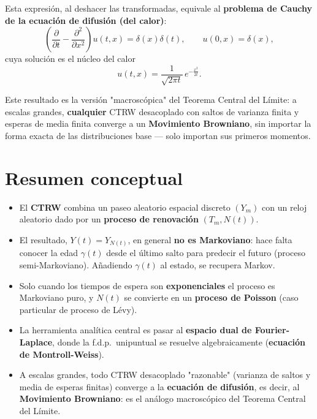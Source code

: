 \documentclass[10pt]{book}
\begin{document}
\begin{teo}
Esta expresión, al deshacer las transformadas, equivale al \textbf{problema de Cauchy de la ecuación de difusión (del calor)}:
\begin{equation*}
    \left(\frac{\partial}{\partial t}-\frac{\partial^2}{\partial x^2}\right)u(t,x) = \delta(x)\delta(t), \qquad u(0,x)=\delta(x),
\end{equation*}
cuya solución es el núcleo del calor
\begin{equation*}
    u(t,x) = \frac{1}{\sqrt{2\pi t}}\, e^{-\frac{x^2}{2t}}.
\end{equation*}
\end{teo}

\begin{observacion}
Este resultado es la versión "macroscópica" del Teorema Central del Límite: a escalas grandes, \textbf{cualquier} CTRW desacoplado con saltos de varianza finita y esperas de media finita converge a un \textbf{Movimiento Browniano}, sin importar la forma exacta de las distribuciones base — solo importan sus primeros momentos.
\end{observacion}

\section{Resumen conceptual}

\begin{itemize}
    \item El \textbf{CTRW} combina un paseo aleatorio espacial discreto $(Y_m)$ con un reloj aleatorio dado por un \textbf{proceso de renovación} $(T_m, N(t))$.
    \item El resultado, $Y(t)=Y_{N(t)}$, en general \textbf{no es Markoviano}: hace falta conocer la edad $\gamma(t)$ desde el último salto para predecir el futuro (proceso semi-Markoviano). Añadiendo $\gamma(t)$ al estado, se recupera Markov.
    \item Solo cuando los tiempos de espera son \textbf{exponenciales} el proceso es Markoviano puro, y $N(t)$ se convierte en un \textbf{proceso de Poisson} (caso particular de proceso de Lévy).
    \item La herramienta analítica central es pasar al \textbf{espacio dual de Fourier-Laplace}, donde la f.d.p.\ unipuntual se resuelve algebraicamente (\textbf{ecuación de Montroll-Weiss}).
    \item A escalas grandes, todo CTRW desacoplado "razonable" (varianza de saltos y media de esperas finitas) converge a la \textbf{ecuación de difusión}, es decir, al \textbf{Movimiento Browniano}: es el análogo macroscópico del Teorema Central del Límite.
\end{itemize}
\end{document}
